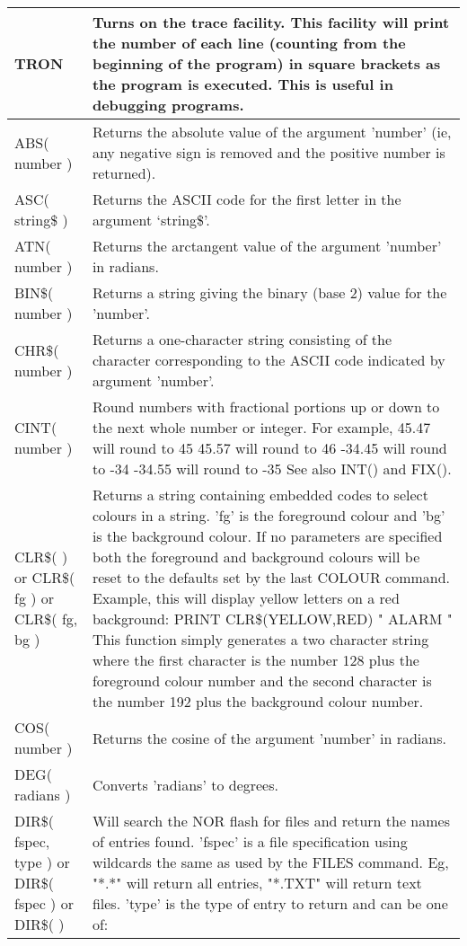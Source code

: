 \documentclass[11pt,fleqn]{book} %
\numberwithin{equation}{section} %
\numberwithin{figure}{section} %
\numberwithin{table}{section} %
\begin{document}
\begin{table}[]
\begin{tabular}{|p{4cm}|p{10cm}|}
\\ \hline
TRON & Turns on the trace facility. This facility will print the number of each line
(counting from the beginning of the program) in square brackets as the
program is executed. This is useful in debugging programs.
\\ \hline
ABS( number ) & Returns the absolute value of the argument 'number' (ie, any negative
sign is removed and the positive number is returned).
\\ \hline
ASC( string\$ ) & Returns the ASCII code for the first letter in the argument ‘string\$’.
\\ \hline
ATN( number ) & Returns the arctangent value of the argument 'number' in radians.
\\ \hline
BIN\$( number ) & Returns a string giving the binary (base 2) value for the 'number'.
\\ \hline
CHR\$( number ) & Returns a one-character string consisting of the character corresponding
to the ASCII code indicated by argument 'number'.
\\ \hline
CINT( number ) & Round numbers with fractional portions up or down to the next whole
number or integer.
For example,
45.47 will round to 45
45.57 will round to 46
-34.45 will round to -34
-34.55 will round to -35
See also INT() and FIX().
\\ \hline
CLR\$( )
or
CLR\$( fg )
or
CLR\$( fg, bg )
 & Returns a string containing embedded codes to select colours in a string.
'fg' is the foreground colour and 'bg' is the background colour. If no
parameters are specified both the foreground and background colours
will be reset to the defaults set by the last COLOUR command.
Example, this will display yellow letters on a red background:
PRINT CLR\$(YELLOW,RED) " ALARM "
This function simply generates a two character string where the first
character is the number 128 plus the foreground colour number and the
second character is the number 192 plus the background colour number.
\\ \hline
COS( number ) & Returns the cosine of the argument 'number' in radians.
\\ \hline
DEG( radians ) & Converts 'radians' to degrees.
\\ \hline
DIR\$( fspec, type )
or
DIR\$( fspec )
or
DIR\$( )
 & Will search the NOR flash for files and return the names of entries found.
'fspec' is a file specification using wildcards the same as used by the
FILES command. Eg, "*.*" will return all entries, "*.TXT" will return
text files.
'type' is the type of entry to return and can be one of:

\end{tabular}
\end{table}
\end{document}
